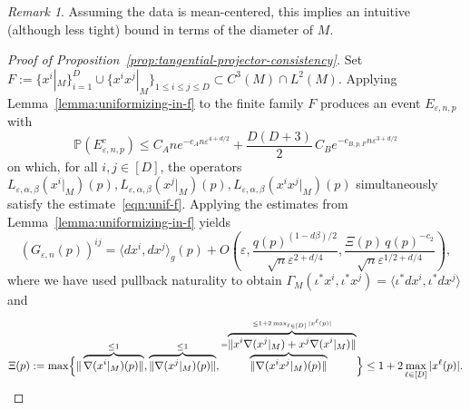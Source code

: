 \documentclass{article}
\theoremstyle{remark}
\newtheorem{remark}{Remark}
\theoremstyle{plain}
\begin{document}
\begin{remark}
    Assuming the data is mean-centered, this implies an intuitive (although less tight) bound in terms of the diameter of $M$. 
\end{remark}



\begin{proof}[Proof of Proposition~\ref{prop:tangential-projector-consistency}]
Set $F:=\{ x^{i} |_{M} \}_{i=1}^{D} \cup \{ x^{i}x^{j} |_{M} \}_{1 \leq i \leq j \leq D} \subset C^{3}(M) \cap L^{2}(M)$. 
Applying Lemma~\ref{lemma:uniformizing-in-f} to the finite family \( F \) produces an event
\(E_{\varepsilon,n,p}\) with \[\mathbb P(E_{\varepsilon,n,p}^c)\leq C_A n e^{-c_A n\varepsilon^{4+d/2}}+\frac{D(D+3)}2\,C_B e^{-c_{B,p,F_{}}n\varepsilon^{3+d/2}}
\]
on which, for all \( i, j \in [D] \), the operators
\( L_{\varepsilon,\alpha,\beta}(x^i|_M)(p), L_{\varepsilon,\alpha,\beta}(x^j|_M)(p), L_{\varepsilon,\alpha,\beta}(x^i x^j|_M)(p) \) simultaneously satisfy the estimate~\eqref{eqn:unif-f}. Applying the estimates from Lemma~\ref{lemma:uniformizing-in-f} yields
\[(G_{\varepsilon, n}(p))^{ij}=\langle dx^i,dx^j\rangle_g(p)+O\left(\varepsilon, \frac{q(p)^{(1-d\beta)/2}}{\sqrt n\varepsilon^{2+d/4}}, \frac{\Xi(p)\,q(p)^{-c_2}}{\sqrt n\varepsilon^{1/2+d/4}}\right),
\] where we have used pullback naturality to obtain $\Gamma_{M}(\iota^{*}x^{i}, \iota^{*}x^{j})=\langle \iota^{*}dx^{i}, \iota^{*}dx^{j} \rangle$ and 
\[
\Xi(p):=\max\Bigl\{\|\overbrace{ \nabla(x^i|_M)(p)\| }^{ \leq 1 },\overbrace{ \|\nabla(x^j|_M)(p)\| }^{ \leq 1 },\overbrace{ \|\nabla(x^i x^j|_M)(p)\| }^{=\overbrace{ \| x^{i} \nabla(x^{j} |_{M}) +x^{j} \nabla(x^{i} |_{M}) \| }^{ \leq 1 + 2 \max_{\ell \in [D]}|x^{\ell}(p)| } }\Bigr\}\leq 1+2 \max_{\ell \in [D]}|x^{\ell}(p)|. 
\]
\end{proof}
\end{document}
